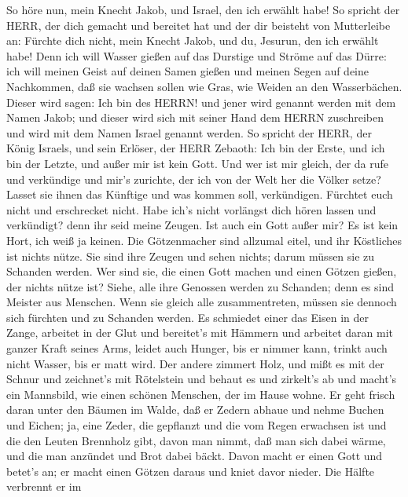  So höre nun, mein Knecht Jakob, und Israel, den ich erwählt
habe!  So spricht der HERR, der dich gemacht und bereitet
hat und der dir beisteht von Mutterleibe an: Fürchte dich nicht, mein
Knecht Jakob, und du, Jesurun, den ich erwählt habe!  Denn
ich will Wasser gießen auf das Durstige und Ströme auf das Dürre: ich
will meinen Geist auf deinen Samen gießen und meinen Segen auf deine
Nachkommen,  daß sie wachsen sollen wie Gras, wie Weiden an
den Wasserbächen.  Dieser wird sagen: Ich bin des HERRN! und
jener wird genannt werden mit dem Namen Jakob; und dieser wird sich mit
seiner Hand dem HERRN zuschreiben und wird mit dem Namen Israel genannt
werden.  So spricht der HERR, der König Israels, und sein
Erlöser, der HERR Zebaoth: Ich bin der Erste, und ich bin der Letzte,
und außer mir ist kein Gott.  Und wer ist mir gleich, der da
rufe und verkündige und mir's zurichte, der ich von der Welt her die
Völker setze? Lasset sie ihnen das Künftige und was kommen soll,
verkündigen.  Fürchtet euch nicht und erschrecket nicht.
Habe ich's nicht vorlängst dich hören lassen und verkündigt? denn ihr
seid meine Zeugen. Ist auch ein Gott außer mir? Es ist kein Hort, ich
weiß ja keinen.  Die Götzenmacher sind allzumal eitel, und
ihr Köstliches ist nichts nütze. Sie sind ihre Zeugen und sehen nichts;
darum müssen sie zu Schanden werden.  Wer sind sie, die
einen Gott machen und einen Götzen gießen, der nichts nütze ist?
 Siehe, alle ihre Genossen werden zu Schanden; denn es sind
Meister aus Menschen. Wenn sie gleich alle zusammentreten, müssen sie
dennoch sich fürchten und zu Schanden werden.  Es schmiedet
einer das Eisen in der Zange, arbeitet in der Glut und bereitet's mit
Hämmern und arbeitet daran mit ganzer Kraft seines Arms, leidet auch
Hunger, bis er nimmer kann, trinkt auch nicht Wasser, bis er matt wird.
 Der andere zimmert Holz, und mißt es mit der Schnur und
zeichnet's mit Rötelstein und behaut es und zirkelt's ab und macht's ein
Mannsbild, wie einen schönen Menschen, der im Hause wohne. 
Er geht frisch daran unter den Bäumen im Walde, daß er Zedern abhaue und
nehme Buchen und Eichen; ja, eine Zeder, die gepflanzt und die vom Regen
erwachsen ist  und die den Leuten Brennholz gibt, davon man
nimmt, daß man sich dabei wärme, und die man anzündet und Brot dabei
bäckt. Davon macht er einen Gott und betet's an; er macht einen Götzen
daraus und kniet davor nieder.  Die Hälfte verbrennt er im
